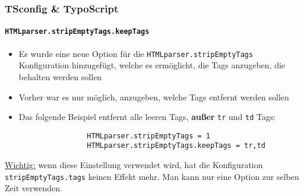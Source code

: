 \begin{frame}[fragile]
	\frametitle{TSconfig \& TypoScript}
	\framesubtitle{\texttt{HTMLparser.stripEmptyTags.keepTags}}

	\lstset{basicstyle=\tiny\ttfamily}

	\begin{itemize}

		\item Es wurde eine neue Option für die \texttt{HTMLparser.stripEmptyTags} Konfiguration hinzugefügt, welche es ermöglicht, die Tags anzugeben, die behalten werden sollen
		\item Vorher war es nur möglich, anzugeben, welche Tags entfernt werden sollen
		\item Das folgende Beispiel entfernt alle leeren Tags, \textbf{außer} \texttt{tr} und \texttt{td} Tags:

			\begin{lstlisting}
				HTMLparser.stripEmptyTags = 1
				HTMLparser.stripEmptyTags.keepTags = tr,td
			\end{lstlisting}

	\end{itemize}

	\underline{Wichtig:} wenn diese Einstellung verwendet wird, hat die Konfiguration \texttt{stripEmptyTags.tags} keinen Effekt mehr. Man kann nur eine Option zur selben Zeit verwenden.

\end{frame}

